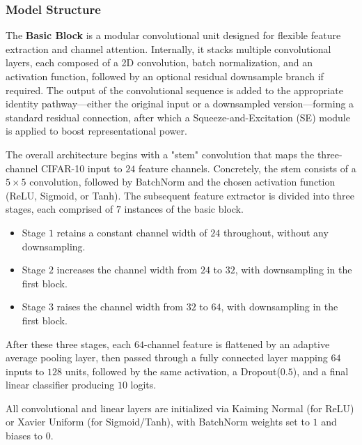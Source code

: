 \documentclass{article}
\begin{document}
\subsubsection{Model Structure}

The \textbf{Basic Block} is a modular convolutional unit designed for flexible feature extraction and channel attention. Internally, it stacks multiple convolutional layers, each composed of a 2D convolution, batch normalization, and an activation function, followed by an optional residual downsample branch if required. The output of the convolutional sequence is added to the appropriate identity pathway—either the original input or a downsampled version—forming a standard residual connection, after which a Squeeze-and-Excitation (SE) module is applied to boost representational power.

The overall architecture begins with a "stem" convolution that maps the three-channel CIFAR-10 input to $24$ feature channels. Concretely, the stem consists of a $5\times 5$ convolution, followed by BatchNorm and the chosen activation function (ReLU, Sigmoid, or Tanh). The subsequent feature extractor is divided into three stages, each comprised of $7$ instances of the basic block.

\begin{itemize}
    \item Stage $1$ retains a constant channel width of $24$ throughout, without any downsampling.

    \item Stage $2$ increases the channel width from $24$ to $32$, with downsampling in the first block.

    \item Stage $3$ raises the channel width from $32$ to $64$, with downsampling in the first block.
\end{itemize}

After these three stages, each $64$-channel feature is flattened by an adaptive average pooling layer, then passed through a fully connected layer mapping $64$ inputs to $128$ units, followed by the same activation, a Dropout($0.5$), and a final linear classifier producing $10$ logits. 

All convolutional and linear layers are initialized via Kaiming Normal (for ReLU) or Xavier Uniform (for Sigmoid/Tanh), with BatchNorm weights set to $1$ and biases to $0$.

\end{document}

